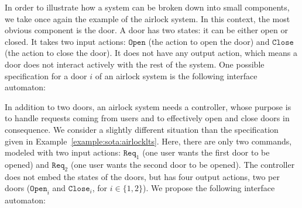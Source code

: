 \begin{example}
  \label{example:sota:airlockinterface}

  In order to illustrate how a system can be broken down into small components,
  we take once again the example of the airlock system.
  In this context, the most obvious component is the door.
  A door has two states: it can be either open or closed.
  It takes two input actions: \( \mathtt{Open} \) (the action to open the door)
  and \( \mathtt{Close} \) (the action to close the door).
  It does not have any output action, which means a door does not interact
  actively with the rest of the system.
  One possible specification for a door $i$ of an airlock system is the
  following interface automaton:

  \begin{center}
  \end{center}

  In addition to two doors, an airlock system needs a controller, whose purpose
  is to handle requests coming from users and to effectively open and close
  doors in consequence.
  We consider a slightly different situation than the specification given in
  Example~\ref{example:sota:airlocklts}.
  Here, there are only two commands, modeled with two input actions:
  \( \mathtt{Req}_1 \) (one user wants the first door to be opened) and
  \( \mathtt{Req}_2 \) (one user wants the second door to be opened).
  The controller does not embed the states of the doors, but has four output
  actions, two per doors (\( \mathtt{Open}_i \) and \( \mathtt{Close}_i\), for
  \( i \in \{1, 2\}\)).
  We propose the following interface automaton:


\end{example}
